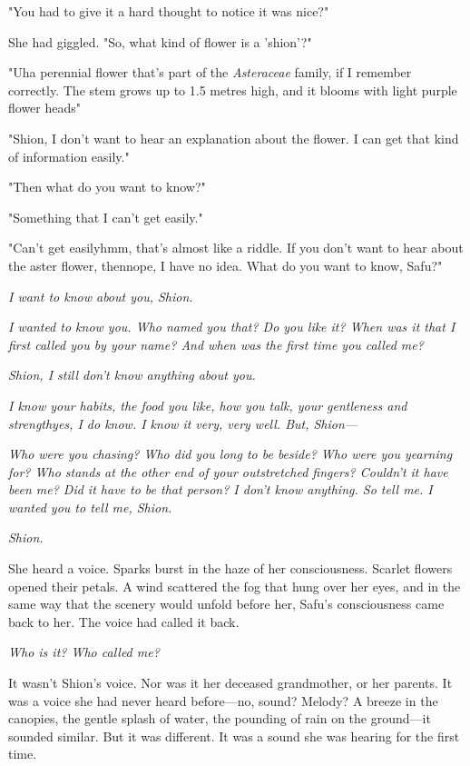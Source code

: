 "You had to give it a hard thought to notice it was nice?"

She had giggled. "So, what kind of flower is a 'shion'?"

"Uh\el a perennial flower that's part of the \emph{Asteraceae} family, if I
remember correctly. The stem grows up to 1.5 metres high, and it blooms
with light purple flower heads\el "

"Shion, I don't want to hear an explanation about the flower. I can get
that kind of information easily."

"Then what do you want to know?"

"Something that I can't get easily."

"Can't get easily\el hmm, that's almost like a riddle. If you don't want
to hear about the aster flower, then\el nope, I have no idea. What do
you want to know, Safu?"

\emph{I want to know about you, Shion.}

\emph{I wanted to know you. Who named you that? Do you like it? When was
it that I first called you by your name? And when was the first time you
called me\el ?}

\emph{Shion, I still don't know anything about you.}

\emph{I know your habits, the food you like, how you talk, your
gentleness and strength\el yes, I do know. I know it very, very well.
But, Shion---}

\emph{Who were you chasing? Who did you long to be beside? Who were you
yearning for? Who stands at the other end of your outstretched fingers?
Couldn't it have been me? Did it have to be that person? I don't know
anything. So tell me. I wanted you to tell me, Shion.}

\emph{Shion.}

\mybreak


She heard a voice. Sparks burst in the haze of her consciousness.
Scarlet flowers opened their petals. A wind scattered the fog that hung
over her eyes, and in the same way that the scenery would unfold before
her, Safu's consciousness came back to her. The voice had called it
back.


\emph{Who is it? Who called me?}

It wasn't Shion's voice. Nor was it her deceased grandmother, or her
parents. It was a voice she had never heard before---no, sound? Melody? A
breeze in the canopies, the gentle splash of water, the pounding of rain
on the ground---it sounded similar. But it was different. It was a sound
she was hearing for the first time.

